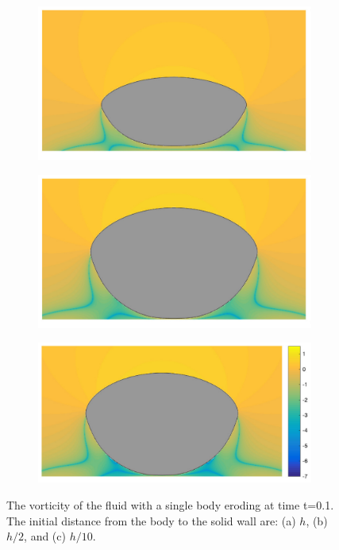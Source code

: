 \documentclass[preprint, 10pt]{elsarticle}
\begin{document}
\begin{figure}[H]
\begin{center}
\begin{subfigure}[b]{0.3\textwidth}
\includegraphics[width = \textwidth]{./figs/1b_0d4r1h_vort}
\caption{}
\end{subfigure}
\begin{subfigure}[b]{0.3\textwidth}
\includegraphics[width = \textwidth]{./figs/1b_0d4r0d5h_vort}
\caption{}
\end{subfigure}
\begin{subfigure}[b]{0.33\textwidth}
\includegraphics[width = \textwidth]{./figs/1b_0d4r0d1h_vort}
\caption{}
\end{subfigure}
\caption{\label{fig:NearWall_vort} The vorticity of the fluid with a
single body eroding at time t=0.1. The initial distance from the body to
the solid wall are: (a) $h$, (b) $h/2$, and (c) $h/10$.}
\end{center}
\end{figure}
\end{document}
